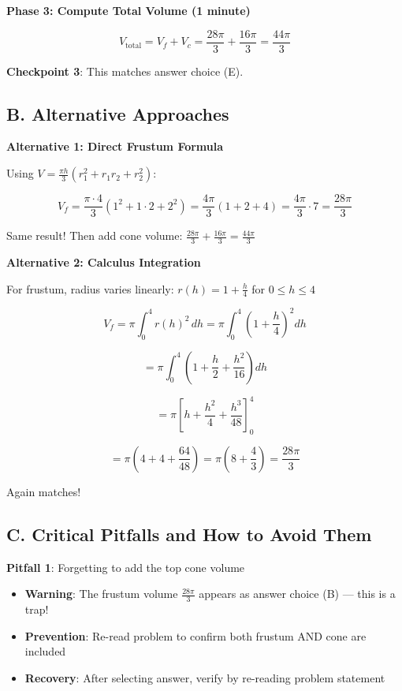\documentclass[]{article}
\begin{document}
\begin{solutionbox}
\textbf{Phase 3: Compute Total Volume (1 minute)}

$$V_{\text{total}} = V_f + V_c = \frac{28\pi}{3} + \frac{16\pi}{3} = \frac{44\pi}{3}$$

\textbf{Checkpoint 3}: This matches answer choice (E).

\subsection*{B. Alternative Approaches}

\textbf{Alternative 1: Direct Frustum Formula}

Using $V = \frac{\pi h}{3}(r_1^2 + r_1 r_2 + r_2^2)$:

$$V_f = \frac{\pi \cdot 4}{3}(1^2 + 1 \cdot 2 + 2^2) = \frac{4\pi}{3}(1 + 2 + 4) = \frac{4\pi}{3} \cdot 7 = \frac{28\pi}{3}$$

Same result! Then add cone volume: $\frac{28\pi}{3} + \frac{16\pi}{3} = \frac{44\pi}{3}$

\textbf{Alternative 2: Calculus Integration}

For frustum, radius varies linearly: $r(h) = 1 + \frac{h}{4}$ for $0 \leq h \leq 4$

$$V_f = \pi \int_0^4 r(h)^2 \, dh = \pi \int_0^4 \left(1 + \frac{h}{4}\right)^2 dh$$

$$= \pi \int_0^4 \left(1 + \frac{h}{2} + \frac{h^2}{16}\right) dh$$

$$= \pi \left[h + \frac{h^2}{4} + \frac{h^3}{48}\right]_0^4$$

$$= \pi \left(4 + 4 + \frac{64}{48}\right) = \pi \left(8 + \frac{4}{3}\right) = \frac{28\pi}{3}$$

Again matches!

\subsection*{C. Critical Pitfalls and How to Avoid Them}

\textbf{Pitfall 1}: Forgetting to add the top cone volume
\begin{itemize}
    \item \textbf{Warning}: The frustum volume $\frac{28\pi}{3}$ appears as answer choice (B) --- this is a trap!
    \item \textbf{Prevention}: Re-read problem to confirm both frustum AND cone are included
    \item \textbf{Recovery}: After selecting answer, verify by re-reading problem statement
\end{itemize}


\end{solutionbox}
\end{document}
